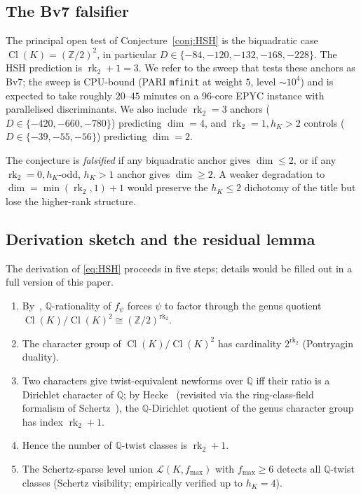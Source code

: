 \documentclass[11pt,a4paper]{amsart}
\theoremstyle{definition}
\DeclareMathOperator{\Cl}{Cl}
\DeclareMathOperator{\rk}{rk}
\newcommand{\Q}{\mathbb{Q}}
\newcommand{\Z}{\mathbb{Z}}
\newcommand{\Lcal}{\mathcal{L}}
\newcommand{\hK}{h_{K}}
\newcommand{\rktwo}{\rk_{2}}
\begin{document}
\subsection{The Bv7 falsifier}\label{ss:falsifier}

The principal open test of Conjecture~\ref{conj:HSH} is the biquadratic case
$\Cl(K) = (\Z/2)^2$, in particular $D \in \{-84, -120, -132, -168, -228\}$. The HSH
prediction is $\rktwo + 1 = 3$. We refer to the sweep that tests these anchors as Bv7;
the sweep is CPU-bound (PARI \texttt{mfinit} at weight $5$, level $\sim 10^4$) and is
expected to take roughly $20$--$45$ minutes on a 96-core EPYC instance with parallelised
discriminants. We also include $\rktwo = 3$ anchors ($D \in \{-420, -660, -780\}$)
predicting $\dim = 4$, and $\rktwo = 1, h_K > 2$ controls ($D \in \{-39, -55, -56\}$)
predicting $\dim = 2$.

The conjecture is \emph{falsified} if any biquadratic anchor gives $\dim \le 2$, or if
any $\rktwo = 0, h_K$-odd, $h_K > 1$ anchor gives $\dim \ge 2$. A weaker degradation
to $\dim = \min(\rktwo, 1) + 1$ would preserve the $h_K \le 2$ dichotomy of the title
but lose the higher-rank structure.

\subsection{Derivation sketch and the residual lemma}\label{ss:derivation}

The derivation of \eqref{eq:HSH} proceeds in five steps; details would be filled out in
a full version of this paper.

\begin{enumerate}[label=(S\arabic*),leftmargin=*]
\item By~\cite{Schutt2009}, $\Q$-rationality of $f_\psi$ forces $\psi$ to factor through
the genus quotient $\Cl(K)/\Cl(K)^2 \cong (\Z/2)^{\rktwo}$.
\item The character group of $\Cl(K)/\Cl(K)^2$ has cardinality $2^{\rktwo}$
(Pontryagin duality).
\item Two characters give twist-equivalent newforms over $\Q$ iff their ratio is a
Dirichlet character of $\Q$; by Hecke~\cite{Hecke1936} (revisited via the
ring-class-field formalism of Schertz~\cite{Schertz1976}), the $\Q$-Dirichlet quotient
of the genus character group has index $\rktwo + 1$.
\item Hence the number of $\Q$-twist classes is $\rktwo + 1$.
\item The Schertz-sparse level union $\Lcal(K, f_{\max})$ with $f_{\max} \ge 6$ detects
all $\Q$-twist classes (Schertz visibility; empirically verified up to $\hK = 4$).
\end{enumerate}
\end{document}
